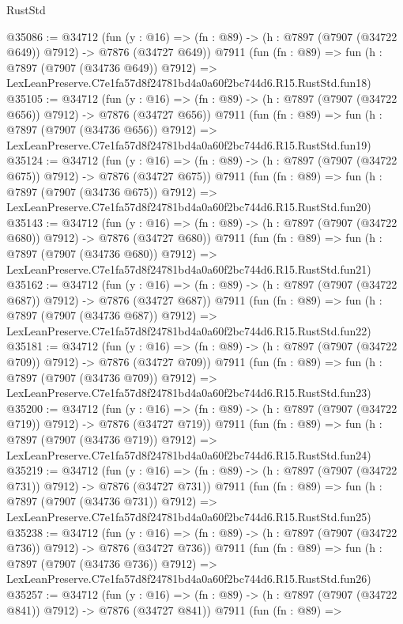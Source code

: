 \begin{lexlean}{RustStd}
\begin{coremodule}
@35086 := @34712
    (fun (y : @16) => (fn : @89) -> (h : @7897 (@7907 (@34722 @649)) @7912) -> @7876 (@34727 @649))
    @7911
    (fun (fn : @89) =>
    fun (h : @7897 (@7907 (@34736 @649)) @7912) =>
    LexLeanPreserve.C7e1fa57d8f24781bd4a0a60f2bc744d6.R15.RustStd.fun18)
@35105 := @34712
    (fun (y : @16) => (fn : @89) -> (h : @7897 (@7907 (@34722 @656)) @7912) -> @7876 (@34727 @656))
    @7911
    (fun (fn : @89) =>
    fun (h : @7897 (@7907 (@34736 @656)) @7912) =>
    LexLeanPreserve.C7e1fa57d8f24781bd4a0a60f2bc744d6.R15.RustStd.fun19)
@35124 := @34712
    (fun (y : @16) => (fn : @89) -> (h : @7897 (@7907 (@34722 @675)) @7912) -> @7876 (@34727 @675))
    @7911
    (fun (fn : @89) =>
    fun (h : @7897 (@7907 (@34736 @675)) @7912) =>
    LexLeanPreserve.C7e1fa57d8f24781bd4a0a60f2bc744d6.R15.RustStd.fun20)
@35143 := @34712
    (fun (y : @16) => (fn : @89) -> (h : @7897 (@7907 (@34722 @680)) @7912) -> @7876 (@34727 @680))
    @7911
    (fun (fn : @89) =>
    fun (h : @7897 (@7907 (@34736 @680)) @7912) =>
    LexLeanPreserve.C7e1fa57d8f24781bd4a0a60f2bc744d6.R15.RustStd.fun21)
@35162 := @34712
    (fun (y : @16) => (fn : @89) -> (h : @7897 (@7907 (@34722 @687)) @7912) -> @7876 (@34727 @687))
    @7911
    (fun (fn : @89) =>
    fun (h : @7897 (@7907 (@34736 @687)) @7912) =>
    LexLeanPreserve.C7e1fa57d8f24781bd4a0a60f2bc744d6.R15.RustStd.fun22)
@35181 := @34712
    (fun (y : @16) => (fn : @89) -> (h : @7897 (@7907 (@34722 @709)) @7912) -> @7876 (@34727 @709))
    @7911
    (fun (fn : @89) =>
    fun (h : @7897 (@7907 (@34736 @709)) @7912) =>
    LexLeanPreserve.C7e1fa57d8f24781bd4a0a60f2bc744d6.R15.RustStd.fun23)
@35200 := @34712
    (fun (y : @16) => (fn : @89) -> (h : @7897 (@7907 (@34722 @719)) @7912) -> @7876 (@34727 @719))
    @7911
    (fun (fn : @89) =>
    fun (h : @7897 (@7907 (@34736 @719)) @7912) =>
    LexLeanPreserve.C7e1fa57d8f24781bd4a0a60f2bc744d6.R15.RustStd.fun24)
@35219 := @34712
    (fun (y : @16) => (fn : @89) -> (h : @7897 (@7907 (@34722 @731)) @7912) -> @7876 (@34727 @731))
    @7911
    (fun (fn : @89) =>
    fun (h : @7897 (@7907 (@34736 @731)) @7912) =>
    LexLeanPreserve.C7e1fa57d8f24781bd4a0a60f2bc744d6.R15.RustStd.fun25)
@35238 := @34712
    (fun (y : @16) => (fn : @89) -> (h : @7897 (@7907 (@34722 @736)) @7912) -> @7876 (@34727 @736))
    @7911
    (fun (fn : @89) =>
    fun (h : @7897 (@7907 (@34736 @736)) @7912) =>
    LexLeanPreserve.C7e1fa57d8f24781bd4a0a60f2bc744d6.R15.RustStd.fun26)
@35257 := @34712
    (fun (y : @16) => (fn : @89) -> (h : @7897 (@7907 (@34722 @841)) @7912) -> @7876 (@34727 @841))
    @7911
    (fun (fn : @89) =>

\end{coremodule}
\end{lexlean}
